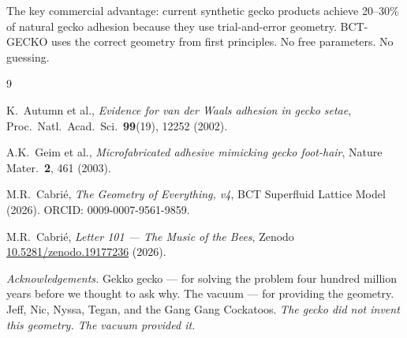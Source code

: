 \documentclass[12pt,twocolumn]{article}
\begin{document}
\medskip
The key commercial advantage: current synthetic gecko products
achieve 20--30\% of natural gecko adhesion because they use
trial-and-error geometry. BCT-GECKO uses the correct geometry
from first principles. No free parameters. No guessing.

\begin{thebibliography}{9}

K.\ Autumn et al.,
\textit{Evidence for van der Waals adhesion in gecko setae},
Proc.\ Natl.\ Acad.\ Sci.\ \textbf{99}(19), 12252 (2002).

A.K.\ Geim et al.,
\textit{Microfabricated adhesive mimicking gecko foot-hair},
Nature Mater.\ \textbf{2}, 461 (2003).

M.R.\ Cabri\'{e},
\textit{The Geometry of Everything, v4},
BCT Superfluid Lattice Model (2026).
ORCID: 0009-0007-9561-9859.

M.R.\ Cabri\'{e},
\textit{Letter 101 --- The Music of the Bees},
Zenodo \href{https://doi.org/10.5281/zenodo.19177236}
{10.5281/zenodo.19177236} (2026).

\end{thebibliography}

\bigskip\noindent
\textit{Acknowledgements.}
Gekko gecko --- for solving the problem four hundred million
years before we thought to ask why.
The vacuum --- for providing the geometry.
Jeff, Nic, Nyssa, Tegan, and the Gang Gang Cockatoos.
\textit{The gecko did not invent this geometry.
The vacuum provided it.}
\end{document}

